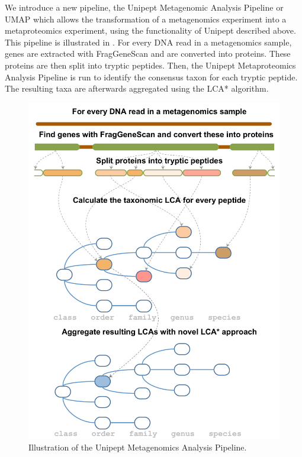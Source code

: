 \documentclass[twocolumn]{phdsymp}
\begin{document}
We introduce a new pipeline, the Unipept Metagenomic Analysis Pipeline or UMAP
which allows the transformation of a metagenomics experiment into a
metaproteomics experiment, using the functionality of Unipept described above.
This pipeline is illustrated in . For every DNA read in a
metagenomics sample, genes are extracted with
FragGeneScan\cite{rho2010fraggenescan} and are converted into proteins. These
proteins are then split into tryptic peptides. Then, the Unipept Metaproteomics
Analysis Pipeline is run to identify the consensus taxon for each tryptic
peptide. The resulting taxa are afterwards aggregated using the LCA* algorithm.

\begin{figure}[hbt]
	\centering
	\includegraphics[width=\columnwidth]{includes/van_metagenoom_naar_metaproteoom.pdf}
	\caption{Illustration of the Unipept Metagenomics Analysis Pipeline. }
	\label{fig:van_naar}
\end{figure}
\end{document}
